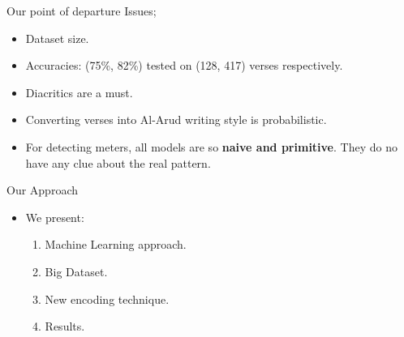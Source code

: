 \begin{frame}[fragile]{Our point of departure}
Issues;
\begin{itemize}
\item Dataset size.
\item Accuracies: (75\%, 82\%) tested on (128, 417) verses respectively.
\item Diacritics are a must.
\item Converting verses into Al-Arud writing style is probabilistic.
\item For detecting meters, all models are so \textbf{naive and primitive}. They do no have any clue about the real pattern.

\end{itemize}
\end{frame}

\begin{frame}[fragile]{Our Approach}
\begin{itemize}
\item We present:
\begin{enumerate}
	\item<1-> Machine Learning approach.
	\item<2-> Big Dataset.
	\item<3-> New encoding technique.
	\item<4-> Results.
\end{enumerate}
\end{itemize}


\end{frame}


